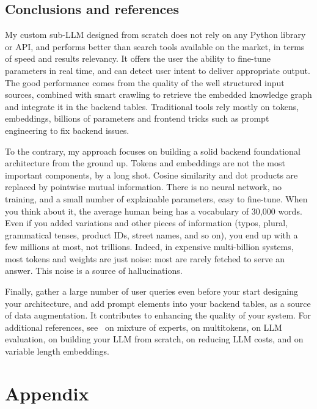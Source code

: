 \documentclass[10pt]{article}
\begin{document}
{\subsection{Conclusions and references}

My custom sub-LLM designed from scratch does not rely on any Python library or API, and performs better than search tools available on the market, 
 in terms of speed and results relevancy. It offers the user the ability to fine-tune parameters in real time, and can detect user intent to deliver
 appropriate output. The good performance comes from the quality of the well structured input sources, combined with smart
 crawling to retrieve the embedded knowledge graph and integrate it in the backend tables. Traditional tools rely mostly on tokens, embeddings, billions of parameters and frontend tricks such as prompt engineering to fix backend issues. 

To the contrary, my approach focuses on building a solid backend
foundational  architecture from the ground up. Tokens and embeddings are not the most important components, by a long shot. Cosine similarity and dot products are replaced by
pointwise mutual information. There is no neural network, no training, and a small number of explainable parameters, easy to fine-tune.
When you think about it, the average human being has a vocabulary of 30,000 words. Even if you added variations and other pieces of information (typos, plural, grammatical tenses, 
 product IDs, street names, and so on), you end up with a few millions at most, not trillions. Indeed, in expensive multi-billion systems,
 most tokens and weights are just noise:  most are rarely fetched to serve an answer. This noise is a source of hallucinations.

Finally, gather a large number of user queries even before your start designing your architecture, and add 
prompt elements into your backend tables, as a source of data  augmentation.
 It contributes to enhancing the quality of your system.
For additional references, see~\cite{mexperts} on mixture of experts, \cite{mtokens} on multitokens, 
\cite{24erw2, eval34edr} on LLM evaluation, \cite{serg24} on building your LLM from scratch,
\cite{breze24} on reducing LLM costs, and \cite{vle23} on variable length embeddings.




\section{Appendix}
}
\end{document}
